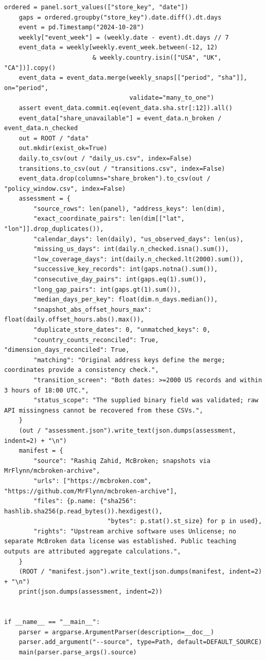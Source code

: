 \begin{Verbatim}[breaklines,breakanywhere,fontsize=\small]
    ordered = panel.sort_values(["store_key", "date"])
    gaps = ordered.groupby("store_key").date.diff().dt.days
    event = pd.Timestamp("2024-10-28")
    weekly["event_week"] = (weekly.date - event).dt.days // 7
    event_data = weekly[weekly.event_week.between(-12, 12)
                        & weekly.country.isin(["USA", "UK", "CA"])].copy()
    event_data = event_data.merge(weekly_snaps[["period", "sha"]], on="period",
                                  validate="many_to_one")
    assert event_data.commit.eq(event_data.sha.str[:12]).all()
    event_data["share_unavailable"] = event_data.n_broken / event_data.n_checked
    out = ROOT / "data"
    out.mkdir(exist_ok=True)
    daily.to_csv(out / "daily_us.csv", index=False)
    transitions.to_csv(out / "transitions.csv", index=False)
    event_data.drop(columns="share_broken").to_csv(out / "policy_window.csv", index=False)
    assessment = {
        "source_rows": len(panel), "address_keys": len(dim),
        "exact_coordinate_pairs": len(dim[["lat", "lon"]].drop_duplicates()),
        "calendar_days": len(daily), "us_observed_days": len(us),
        "missing_us_days": int(daily.n_checked.isna().sum()),
        "low_coverage_days": int(daily.n_checked.lt(2000).sum()),
        "successive_key_records": int(gaps.notna().sum()),
        "consecutive_day_pairs": int(gaps.eq(1).sum()),
        "long_gap_pairs": int(gaps.gt(1).sum()),
        "median_days_per_key": float(dim.n_days.median()),
        "snapshot_abs_offset_hours_max": float(daily.offset_hours.abs().max()),
        "duplicate_store_dates": 0, "unmatched_keys": 0,
        "country_counts_reconciled": True, "dimension_days_reconciled": True,
        "matching": "Original address keys define the merge; coordinates provide a consistency check.",
        "transition_screen": "Both dates: >=2000 US records and within 3 hours of 18:00 UTC.",
        "status_scope": "The supplied binary field was validated; raw API missingness cannot be recovered from these CSVs.",
    }
    (out / "assessment.json").write_text(json.dumps(assessment, indent=2) + "\n")
    manifest = {
        "source": "Rashiq Zahid, McBroken; snapshots via MrFlynn/mcbroken-archive",
        "urls": ["https://mcbroken.com", "https://github.com/MrFlynn/mcbroken-archive"],
        "files": {p.name: {"sha256": hashlib.sha256(p.read_bytes()).hexdigest(),
                            "bytes": p.stat().st_size} for p in used},
        "rights": "Upstream archive software uses Unlicense; no separate McBroken data license was established. Public teaching outputs are attributed aggregate calculations.",
    }
    (ROOT / "manifest.json").write_text(json.dumps(manifest, indent=2) + "\n")
    print(json.dumps(assessment, indent=2))


if __name__ == "__main__":
    parser = argparse.ArgumentParser(description=__doc__)
    parser.add_argument("--source", type=Path, default=DEFAULT_SOURCE)
    main(parser.parse_args().source)
\end{Verbatim}

